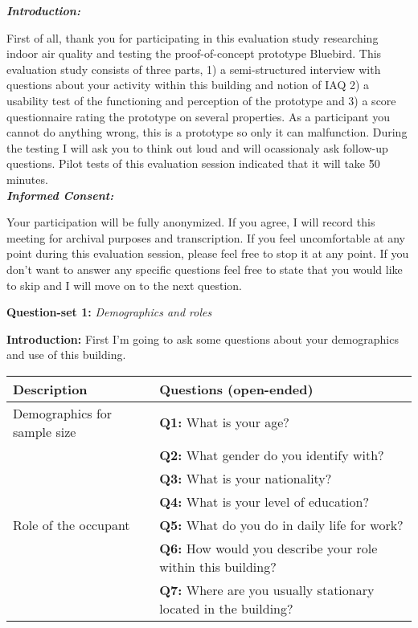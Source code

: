 \begin{appendices}
\vspace{5pt}

\textit{\textbf{Introduction:}}

First of all, thank you for participating in this evaluation study researching indoor air quality and testing the proof-of-concept prototype Bluebird. This evaluation study consists of three parts, 1) a semi-structured interview with questions about your activity within this building and notion of IAQ 2) a usability test of the functioning and perception of the prototype and 3) a score questionnaire rating the prototype on several properties. As a participant you cannot do anything wrong, this is a prototype so only it can malfunction. During the testing I will ask you to think out loud and will ocassionaly ask follow-up questions. Pilot tests of this evaluation session indicated that it will take \~50 minutes. \\

\textit{\textbf{Informed Consent:}}

Your participation will be fully anonymized. If you agree, I will record this meeting for archival purposes and transcription. If you feel uncomfortable at any point during this evaluation session, please feel free to stop it at any point. If you don't want to answer any specific questions feel free to state that you would like to skip and I will move on to the next question.

\begin{table}[htbp]
    \captionsetup{justification=raggedright,singlelinecheck=false}
    \raggedright \textbf{Question-set 1:} \textit{Demographics and roles} \\
    \label{tab:column_widths}
    \raggedright \textbf{Introduction:} First I'm going to ask some questions about your demographics and use of this building.
    \begin{tabularx}{\textwidth}{|p{}|X|}
        \hline
        \textbf{Description} & \textbf{Questions (open-ended)} \\
        \hline
        Demographics for sample size & \textbf{Q1:} What is your age? \\
        & \textbf{Q2:} What gender do you identify with? \\
        & \textbf{Q3:} What is your nationality? \\
        & \textbf{Q4:} What is your level of education? \\
        \hline
        Role of the occupant & 
        \textbf{Q5:} What do you do in daily life for work? \\
        & \textbf{Q6:} How would you describe your role within this building? \\
        & \textbf{Q7:} Where are you usually stationary located in the building? \\
        \hline
    \end{tabularx}
\end{table}


\end{appendices}

